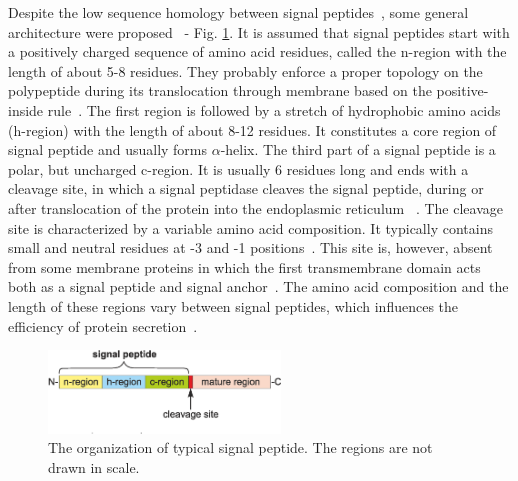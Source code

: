 \documentclass[fleqn,10pt,twoside]{gcb15submission}
\begin{document}
Despite the low sequence homology between signal peptides~\citep{1999ladungaphysean}, some general architecture were proposed~\citep{1994izardsignal, 2013vossmechanism} - Fig. \ref{fig:sparch}. It is assumed that signal peptides start with a positively charged sequence of amino acid residues, called the n-region with the length of about 5-8 residues. They probably enforce a proper topology on the polypeptide during its translocation through membrane based on the positive-inside rule~\citep{1988vonheijnetopogenic}. The first region is followed by a stretch of hydrophobic amino acids (h-region) with the length of about 8-12 residues. It constitutes a core region of signal peptide and usually forms $\alpha$-helix. The third part of a signal peptide is a polar, but uncharged c-region. It is usually 6 residues long and ends with a cleavage site, in which a signal peptidase cleaves the signal peptide, during or after translocation of the protein into the endoplasmic reticulum ~\citep{2002paetzelsignal}. The cleavage site is characterized by a variable amino acid composition. It typically contains small and neutral residues at -3 and -1 positions~\citep{1994palzkillselection}. This site is, however, absent from some membrane proteins in which the first transmembrane domain acts both as a signal peptide and signal anchor~\citep{1988szczesnaskorupapositive}. The amino acid composition and the length of these regions vary between signal peptides, which influences the efficiency of protein secretion~\citep{2006hegdethe}.

\begin{figure}[ht]\centering
\includegraphics[width=0.55\textwidth]{figures/SP.eps}
\caption{The organization of typical signal peptide. The regions are not drawn in scale.}
\label{fig:sparch}
\end{figure}
\end{document}
